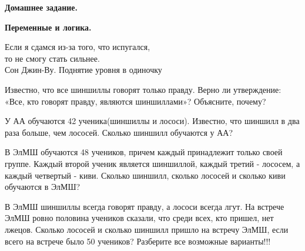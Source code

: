 \hspace{3mm}

\centerline{\bf \Huge Домашнее задание.}
\centerline{\bf \Huge Переменные и логика.}

\begin{flushright}
    \scriptsize{Если я сдамся из-за того, что испугался,\\
                то не смогу стать сильнее.
                \\Сон Джин-Ву. Поднятие уровня в одиночку}
\end{flushright}

 Известно, что все шиншиллы говорят только правду. Верно ли утверждение: «Все, кто говорят правду, являются шиншиллами»?
Объясните, почему?

 У АА обучаются 42 ученика(шиншиллы и лососи). Известно, что шиншилл в два раза больше, чем лососей. Сколько шиншилл обучаются у АА?

 В ЭлМШ обучаются 48 учеников, причем каждый принадлежит только своей группе. Каждый второй ученик является шиншиллой, каждый третий - лососем, а каждый четвертый - киви. Сколько шиншилл, сколько лососей и сколько киви обучаются в ЭлМШ?

 В ЭлМШ шиншиллы всегда говорят правду, а лососи всегда лгут. На встрече ЭлМШ ровно половина учеников сказали, что среди всех, кто пришел, нет лжецов. Сколько лососей и сколько шиншилл пришло на встречу ЭлМШ, если всего на встрече было 50 учеников? Разберите все возможные варианты!!!